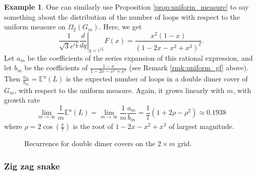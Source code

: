 \documentclass[12pt, reqno]{amsart}
\theoremstyle{definition}
\newtheorem{exam}[theo]{Example}
\newcommand{\E}{\mathbb{E}}%
\begin{document}
\begin {exam}
One can similarly use Proposition \ref{prop:uniform_measure} to say something about the distribution of the number of loops  with respect to the uniform measure on $\Omega_2(G_m)$. Here, we get
$$ 
\frac{1}{\sqrt{3}e^{i\frac{\pi}{6}}}\left. \frac{d}{dq} \right|_{q=e^{i\frac{\pi}{3}}} F(x) = \frac{x^2(1-x)}{(1-2x-x^2+x^3)^2}. 
$$
Let $a_m$ be the coefficients of the series expansion of this rational expression, and let $b_m$ be the coefficients of $\frac{1-x}{1-2x-x^2+x^3}$ (see Remark \ref{rmk:uniform_gf} above). Then $\frac{a_m}{b_m} = \E^u(L)$ is the expected number of loops in a double dimer cover of $G_m$, with respect to the uniform measure. Again, it grows linearly with $m$, with growth rate
$$ 
\lim_{m \to \infty} \frac{1}{m} \E^u(L) = \lim_{m \to \infty} \frac{1}{m}\frac{a_m}{ b_m} = \frac{1}{7} ( 1 + 2\rho - \rho^2 ) \approx 0.1938 
$$
where $\rho = 2\cos(\frac{\pi}{7})$ is the root of $1-2x-x^2+x^3$ of largest magnitude.
\end {exam}

\begin{figure}[t]
    \centering
    \caption{Recurrence for double dimer covers on the $2\times m$ grid.}
    \label{fig:Recurrence}
\end{figure}

\subsubsection{Zig zag snake}
\end{document}
